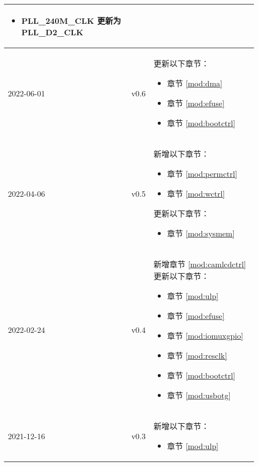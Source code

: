 \begin{longtable}[l]{ | m{2cm} | m{1.5cm} | m{12cm} | }
\begin{itemize}
\begin{itemize}
        \item PLL\_240M\_CLK 更新为 PLL\_D2\_CLK
    \end{itemize}%
    \end{itemize}
    \\\hline
    2022-06-01     & v0.6  &
    更新以下章节：
    \begin{itemize}
        \item 章节 \ref{mod:dma} \textit{\nameref{mod:dma}}
        \item 章节 \ref{mod:efuse} \textit{\nameref{mod:efuse}} %
        \item 章节 \ref{mod:bootctrl} \textit{\nameref{mod:bootctrl}}
    \end{itemize}
    \\\hline
    2022-04-06     & v0.5  &
    新增以下章节：
    \begin{itemize}
        \item 章节 \ref{mod:permctrl} \textit{\nameref{mod:permctrl}}
        \item 章节 \ref{mod:wctrl} \textit{\nameref{mod:wctrl}}
    \end{itemize}
    更新以下章节：
    \begin{itemize}
        \item 章节 \ref{mod:sysmem} \textit{\nameref{mod:sysmem}}
    \end{itemize}
    \\\hline
    2022-02-24     & v0.4  &
    新增章节 \ref{mod:camlcdctrl} \textit{\nameref{mod:camlcdctrl}}
    更新以下章节：
    \begin{itemize}
        \item 章节 \ref{mod:ulp} \textit{\nameref{mod:ulp}} %
        \item 章节 \ref{mod:efuse} \textit{\nameref{mod:efuse}}
        \item 章节 \ref{mod:iomuxgpio} \textit{\nameref{mod:iomuxgpio}} %
        \item 章节 \ref{mod:resclk} \textit{\nameref{mod:resclk}}
        \item 章节 \ref{mod:bootctrl} \textit{\nameref{mod:bootctrl}} %
        \item 章节 \ref{mod:usbotg} \textit{\nameref{mod:usbotg}}
    \end{itemize}
    \\\hline
    2021-12-16 & v0.3 &
    新增以下章节：
        \begin{itemize}
            \item 章节 \ref{mod:ulp} \textit{\nameref{mod:ulp}}

\end{itemize}
\end{longtable}
